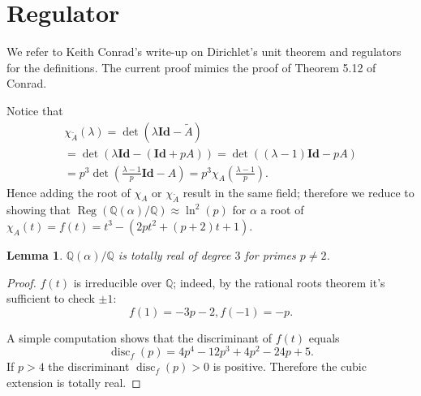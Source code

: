 \documentclass[a4paper]{article}
\newtheorem{Lem}[Thm]{Lemma}
\newcommand{\Q}{\mathbb{Q}}        %
\newcommand{\Id}{\mathbf{Id}}        %
\DeclareMathOperator{\Reg}{Reg}        %
\DeclareMathOperator{\disc}{disc}        %
\begin{document}
\section{Regulator}
We refer to Keith Conrad's write-up on Dirichlet's unit theorem and regulators \cite{conraddirichlet} for the definitions.
The current proof mimics the proof of Theorem 5.12 of Conrad.

Notice that 
\begin{multline}
\chi_{\tilde A}(\lambda) 
= \det(\lambda \Id - \tilde A) \\
= \det(\lambda \Id - (\Id + p A))
= \det((\lambda - 1) \Id - p A)\\
= p^3 \det(\frac{\lambda - 1}p \Id - A)
= p^3 \chi_A(\frac{\lambda - 1}p)
.\end{multline}
Hence adding the root of $\chi_{A}$ or $\chi_{\tilde A}$ result in the same field; therefore we reduce to showing that 
$\Reg ( \Q(\alpha)/\Q ) \approx \ln^2(p) $ for $\alpha$ a root of $\chi_{A}(t) = f(t) = t^3 - (2p t^2 + (p + 2) t + 1) $.

\begin{Lem}
$\Q(\alpha)/\Q$ is totally real of degree $3$ for primes $p \ne 2$.
\end{Lem}
\begin{proof}
$f(t)$ is irreducible over $\Q$; indeed, by the rational roots theorem it's sufficient to check $\pm 1$:
$$f(1) = - 3 p - 2, f(-1) = - p .$$

A simple computation shows that the discriminant of $f(t)$ equals 
\[
	\disc_f(p) = 4 p^4 - 12 p^3 + 4 p^2 - 24 p + 5
.\]
If $p > 4$ the discriminant  $\disc_f(p) > 0$ is positive.
Therefore the cubic extension is totally real.
\end{proof}
\end{document}
